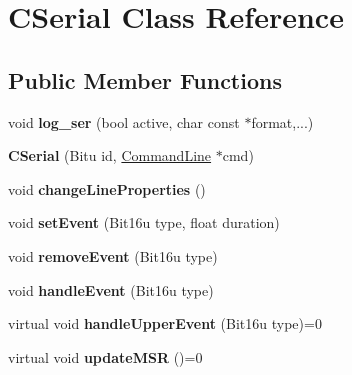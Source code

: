 \hypertarget{classCSerial}{\section{C\-Serial Class Reference}
\label{classCSerial}
}
\subsection*{Public Member Functions}
\begin{DoxyCompactItemize}
\item 
\hypertarget{classCSerial_a4594f795967edcfcc7dc6baf65e86471}{void {\bfseries log\-\_\-ser} (bool active, char const $\ast$format,...)}\label{classCSerial_a4594f795967edcfcc7dc6baf65e86471}

\item 
\hypertarget{classCSerial_a0d6645918fcd02f8ebee1e19b84502d3}{{\bfseries C\-Serial} (Bitu id, \hyperlink{classCommandLine}{Command\-Line} $\ast$cmd)}\label{classCSerial_a0d6645918fcd02f8ebee1e19b84502d3}

\item 
\hypertarget{classCSerial_a45792d7c305b1ebf2f77cc2a239425a5}{void {\bfseries change\-Line\-Properties} ()}\label{classCSerial_a45792d7c305b1ebf2f77cc2a239425a5}

\item 
\hypertarget{classCSerial_a67c9186270470250c91dcdcc3aaea11c}{void {\bfseries set\-Event} (Bit16u type, float duration)}\label{classCSerial_a67c9186270470250c91dcdcc3aaea11c}

\item 
\hypertarget{classCSerial_aca294ec9e6b8c101db31961682e8b611}{void {\bfseries remove\-Event} (Bit16u type)}\label{classCSerial_aca294ec9e6b8c101db31961682e8b611}

\item 
\hypertarget{classCSerial_ab14fff646607c1558e662be1807d310d}{void {\bfseries handle\-Event} (Bit16u type)}\label{classCSerial_ab14fff646607c1558e662be1807d310d}

\item 
\hypertarget{classCSerial_a9eb8589001331e808b9a66cc7858af35}{virtual void {\bfseries handle\-Upper\-Event} (Bit16u type)=0}\label{classCSerial_a9eb8589001331e808b9a66cc7858af35}

\item 
\hypertarget{classCSerial_adf592be677f4e36575fb3b807a371fb5}{virtual void {\bfseries update\-M\-S\-R} ()=0}\label{classCSerial_adf592be677f4e36575fb3b807a371fb5}


\end{DoxyCompactItemize}
